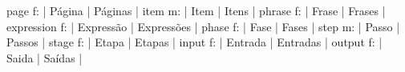\DefNoun  page              f: | Página                | Páginas                 |
\DefNoun  item              m: | Item                  | Itens                   |
\DefNoun  phrase            f: | Frase                 | Frases                  |
\DefNoun  expression        f: | Expressão             | Expressões              |
\DefNoun  phase             f: | Fase                  | Fases                   |
\DefNoun  step              m: | Passo                 | Passos                  |
\DefNoun  stage             f: | Etapa                 | Etapas                  |
\DefNoun  input             f: | Entrada               | Entradas                |
\DefNoun  output            f: | Saida                 | Saídas                  |

